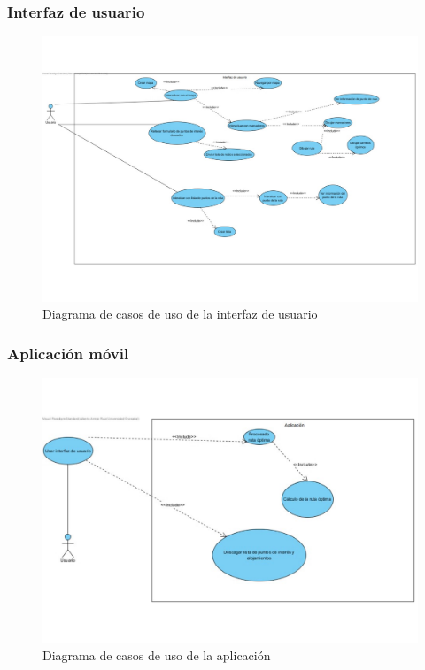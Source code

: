 \subsubsection[Interfaz de usuario]{Interfaz de usuario}
\begin{figure}[H]
	\centering
	\includegraphics[scale=0.5]{imagenes/Interfaz.pdf}
	\caption{Diagrama de casos de uso de la interfaz de usuario}
	\label{fig:user_interface}
\end{figure}

\subsubsection[Aplicación]{Aplicación móvil}
\begin{figure}[H]
	\centering
	\includegraphics[scale=0.55]{imagenes/Aplicacion.pdf}
	\caption{Diagrama de casos de uso de la aplicación}
	\label{fig:app}
\end{figure}

